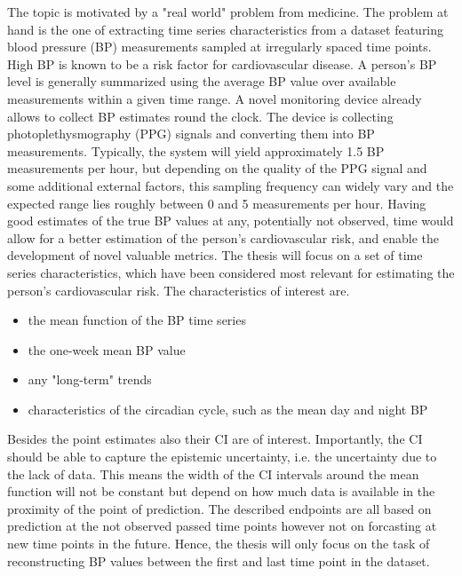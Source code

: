 The topic is motivated by a "real world" problem from medicine.
%
The problem at hand is the one of extracting time series characteristics from a dataset
featuring blood pressure (BP) measurements sampled at irregularly spaced time points.
High BP is known to be a risk factor for cardiovascular disease.
A person’s BP level is generally summarized using the average BP value over available measurements within a given time range.
A novel monitoring device already allows to collect BP estimates round the clock.
The device is collecting photoplethysmography (PPG) signals and converting them into BP measurements.
Typically, the system will yield approximately 1.5 BP measurements per hour, but depending on the quality of the PPG signal and some additional external factors,
this sampling frequency can widely vary and the expected range lies roughly between 0 and 5 measurements per hour.
Having good estimates of the true BP values at any, potentially not observed, time would allow for a better estimation
of the person’s cardiovascular risk, and enable the development of novel valuable metrics.
The thesis will focus on a set of time series characteristics, which have been considered most relevant for estimating
the person’s cardiovascular risk.
The characteristics of interest are.
\begin{itemize}
    \item the mean function of the BP time series
    \item the one-week mean BP value
    \item any "long-term" trends
    \item characteristics of the circadian cycle, such as the mean day and night BP
\end{itemize}
Besides the point estimates also their CI are of interest.
Importantly, the CI should be able to capture the epistemic uncertainty, i.e. the uncertainty due to the lack of data.
This means the width of the CI intervals around the mean function will not be constant but depend on how much
data is available in the proximity of the point of prediction.
The described endpoints are all based on prediction at the not observed passed time points however not on forcasting at new time points in
the future.
Hence, the thesis will only focus on the task of reconstructing BP values between the first and last time point in the dataset.

